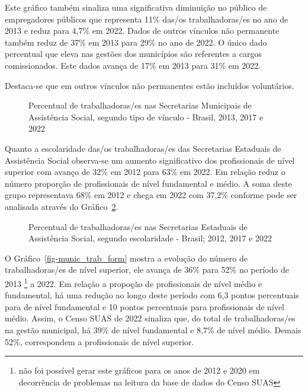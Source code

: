 \documentclass[
  letterpaper,
  DIV=11,
  numbers=noendperiod]{scrreprt}
\begin{document}
Este gráfico também sinaliza uma significativa diminuição no público de
empregadores públicos que representa 11\% das/os trabalhadoras/es no ano
de 2013 e reduz para 4,7\% em 2022. Dados de outros vínculos não
permanente também reduz de 37\% em 2013 para 29\% no ano de 2022. O
único dado percentual que eleva nas gestões dos municípios são
referentes a cargos comissionados. Este dados avança de 17\% em 2013
para 31\% em 2022.

Destaca-se que em outros vínculos não permanentes estão incluídos
voluntários.

\begin{figure}


\caption{\label{fig-munic_trab_vin}Percentual de trabalhadoras/es nas
Secretarias Municipais de Assistência Social, segundo tipo de vínculo -
Brasil, 2013, 2017 e 2022}

\end{figure}%

Quanto a escolaridade das/os trabalhadoras/es das Secretarias Estaduais
de Assistência Social observa-se um aumento significativo dos
profissionais de nível superior com avanço de 32\% em 2012 para 63\% em
2022. Em relação reduz o número proporção de profissionais de nível
fundamental e médio. A soma deste grupo representava 68\% em 2012 e
chega em 2022 com 37,2\% conforme pode ser analisada através do
Gráfico~\ref{fig-uf_trab_form}.

\begin{figure}


\caption{\label{fig-uf_trab_form}Percentual de trabalhadoras/es nas
Secretarias Estaduais de Assistência Social, segundo escolaridade -
Brasil; 2012, 2017 e 2022}

\end{figure}%

O Gráfico~\ref{fig-munic_trab_form} mostra a evolução do número de
trabalhadoras/es de nível superior, ele avança de 36\% para 52\% no
período de 2013 \footnote{não foi possível gerar este gráficos para os
  anos de 2012 e 2020 em decorrência de problemas na leitura da base de
  dados do Censo SUAS} a 2022. Em relação a propoção de profissionais de
nível médio e fundamental, há uma redução ao longo deste período com 6,3
pontos percentuais para de nível fundamental e 10 pontos percentuais
para profissionais de nível médio. Assim, o Censo SUAS de 2022 sinaliza
que, do total de trabalhadoras/es na gestão municipal, há 39\% de nível
fundamental e 8,7\% de nível médio. Demais 52\%, correspondem a
profissionais de nível superior.
\end{document}
